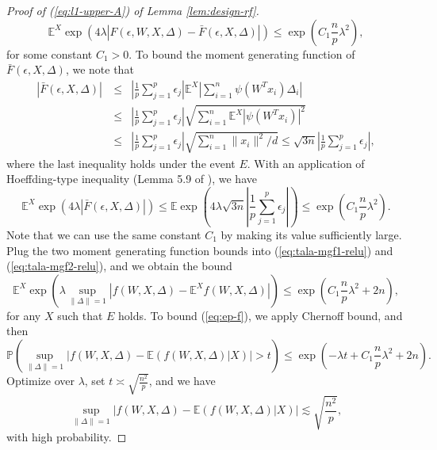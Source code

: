 \begin{proof}[Proof of (\ref{eq:l1-upper-A}) of Lemma \ref{lem:design-rf}]
$$\mathbb{E}^{X}\exp\left(4\lambda|F(\epsilon,W,X,\Delta)-\bar{F}(\epsilon,X,\Delta)|\right) \leq \exp\left(C_1\frac{n}{p}\lambda^2\right),$$
for some constant $C_1>0$. To bound the moment generating function of $\bar{F}(\epsilon,X,\Delta)$, we note that
\begin{eqnarray*}
|\bar{F}(\epsilon,X,\Delta)|\ &\leq& \left|\frac{1}{p}\sum_{j=1}^p\epsilon_j\right|\mathbb{E}^X\left|\sum_{i=1}^n\psi(W^Tx_i)\Delta_i\right| \\
&\leq& \left|\frac{1}{p}\sum_{j=1}^p\epsilon_j\right|\sqrt{\sum_{i=1}^n\mathbb{E}^X|\psi(W^Tx_i)|^2} \\
&\leq& \left|\frac{1}{p}\sum_{j=1}^p\epsilon_j\right|\sqrt{\sum_{i=1}^n\|x_i\|^2/d} \leq \sqrt{3n}\left|\frac{1}{p}\sum_{j=1}^p\epsilon_j\right|,
\end{eqnarray*}
where the last inequality holds under the event $E$. With an application of Hoeffding-type inequality (Lemma 5.9 of \cite{vershynin2010introduction}), we have
$$\mathbb{E}^{X}\exp\left(4\lambda |\bar{F}(\epsilon,X,\Delta)|\right)\leq \mathbb{E}\exp\left(4\lambda\sqrt{3n}\left|\frac{1}{p}\sum_{j=1}^p\epsilon_j\right|\right)\leq \exp\left(C_1\frac{n}{p}\lambda^2\right).$$
Note that we can use the same constant $C_1$ by making its value sufficiently large. Plug the two moment generating function bounds into (\ref{eq:tala-mgf1-relu}) and (\ref{eq:tala-mgf2-relu}), and we obtain the bound
$$\mathbb{E}^X\exp\left(\lambda \sup_{\|\Delta\|=1}\left|f(W,X,\Delta)-\mathbb{E}^Xf(W,X,\Delta)\right|\right)\leq \exp\left(C_1\frac{n}{p}\lambda^2+2n\right),$$
for any $X$ such that $E$ holds. To bound (\ref{eq:ep-f}), we apply Chernoff bound, and then
$$\mathbb{P}\left(\sup_{\|\Delta\|=1}\left|f(W,X,\Delta)-\mathbb{E}(f(W,X,\Delta)|X)\right| > t\right) \leq \exp\left(-\lambda t + C_1\frac{n}{p}\lambda^2+2n\right).$$
Optimize over $\lambda$, set $t\asymp \sqrt{\frac{n^2}{p}}$, and we have
$$\sup_{\|\Delta\|=1}\left|f(W,X,\Delta)-\mathbb{E}(f(W,X,\Delta)|X)\right|\lesssim \sqrt{\frac{n^2}{p}},$$
with high probability.


\end{proof}

